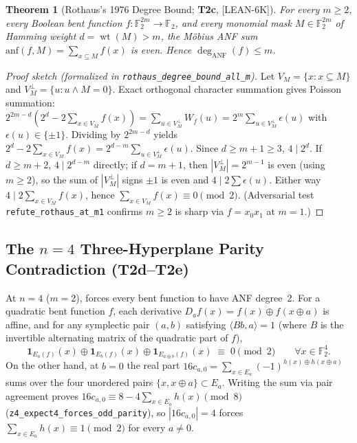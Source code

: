 \documentclass[11pt,reqno]{amsart}
\newtheorem{theorem}{Theorem}[section]
\theoremstyle{definition}
\newcommand{\F}{\mathbb{F}}
\newcommand{\pop}{\operatorname{wt}}
\newcommand{\taglean}{\textsf{[LEAN-6K]}}
\begin{document}
\begin{theorem}[Rothaus's 1976 Degree Bound; \textbf{T2c}, \taglean]\label{thm:rothaus}
For every $m\ge 2$, every Boolean bent function $f:\F_2^{2m}\to\F_2$, and every monomial
mask $M\in\F_2^{2m}$ of Hamming weight $d=\pop(M)>m$, the M\"obius ANF sum
$\mathrm{anf}(f,M)=\sum_{x\subseteq M}f(x)$ is even. Hence $\deg_{\mathrm{ANF}}(f)\le m$.
\end{theorem}

\begin{proof}[Proof sketch (formalized in \texttt{rothaus\_degree\_bound\_all\_m})]
Let $V_M=\{x:x\subseteq M\}$ and $V_M^\perp=\{u:u\wedge M=0\}$. Exact orthogonal
character summation gives Poisson summation:
$2^{2m-d}(2^d - 2\sum_{x\in V_M}f(x)) = \sum_{u\in V_M^\perp}W_f(u) = 2^m\sum_{u\in V_M^\perp}\epsilon(u)$
with $\epsilon(u)\in\{\pm 1\}$. Dividing by $2^{2m-d}$ yields
$2^d - 2\sum_{x\in V_M}f(x) = 2^{d-m}\sum_{u\in V_M^\perp}\epsilon(u)$.
Since $d\ge m+1\ge 3$, $4\mid 2^d$. If $d\ge m+2$, $4\mid 2^{d-m}$ directly; if $d=m+1$,
then $|V_M^\perp|=2^{m-1}$ is even (using $m\ge 2$), so the sum of $|V_M^\perp|$ signs
$\pm 1$ is even and $4\mid 2\sum\epsilon(u)$. Either way $4\mid 2\sum_{x\in V_M}f(x)$,
hence $\sum_{x\in V_M}f(x)\equiv 0\pmod 2$. (Adversarial test
\texttt{refute\_rothaus\_at\_m1} confirms $m\ge 2$ is sharp via $f=x_0x_1$ at $m=1$.)
\end{proof}

\subsection{The \texorpdfstring{$n=4$}{n=4} Three-Hyperplane Parity Contradiction (T2d--T2e)}
At $n=4$ ($m=2$),  forces every bent function to have ANF degree~2.
For a quadratic bent function $f$, each derivative $D_af(x)=f(x)\oplus f(x\oplus a)$
is affine, and for any symplectic pair $(a,b)$ satisfying $\langle Bb,a\rangle=1$
(where $B$ is the invertible alternating matrix of the quadratic part of $f$),
\begin{equation}\label{eq:triple}
  \mathbf{1}_{E_a(f)}(x) \oplus \mathbf{1}_{E_b(f)}(x) \oplus \mathbf{1}_{E_{a\oplus b}(f)}(x)
  \;\equiv\; 0 \pmod 2
  \qquad \forall x\in\F_2^4.
\end{equation}
On the other hand, at $b=0$ the real part $16c_{a,0}=\sum_{x\in E_a}(-1)^{h(x)\oplus h(x\oplus a)}$
sums over the four unordered pairs $\{x,x\oplus a\}\subset E_a$. Writing the sum via pair
agreement proves $16c_{a,0}\equiv 8 - 4\sum_{x\in E_a}h(x)\pmod 8$
(\texttt{z4\_expect4\_forces\_odd\_parity}), so $|16c_{a,0}|=4$ forces
$\sum_{x\in E_a}h(x)\equiv 1\pmod 2$ for every $a\neq 0$.
\end{document}
